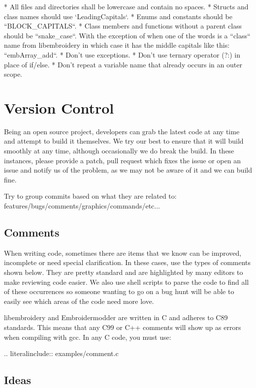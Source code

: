 \documentclass[a4paper]{report}
\begin{document}
* All files and directories shall be lowercase and contain no spaces.
* Structs and class names should use `LeadingCapitals`.
* Enums and constants should be ``BLOCK\_CAPITALS``.
* Class members and functions without a parent class should be ``snake\_case``.
  With the exception of when one of the words is a ``class`` name from
  libembroidery in which case it has the middle capitals like this:
  ``embArray\_add``.
* Don't use exceptions.
* Don't use ternary operator (?:) in place of if/else.
* Don't repeat a variable name that already occurs in an outer scope.

\section{Version Control}

Being an open source project, developers can grab the latest code at any
time and attempt to build it themselves. We try our best to ensure that
it will build smoothly at any time, although occasionally we do break
the build. In these instances, please provide a patch, pull request
which fixes the issue or open an issue and notify us of the problem, as
we may not be aware of it and we can build fine.

Try to group commits based on what they are related to:
features/bugs/comments/graphics/commands/etc...

\subsection{Comments}

When writing code, sometimes there are items that we know can be
improved, incomplete or need special clarification. In these cases, use
the types of comments shown below. They are pretty standard and are
highlighted by many editors to make reviewing code easier. We also use
shell scripts to parse the code to find all of these occurrences so
someone wanting to go on a bug hunt will be able to easily see which
areas of the code need more love.

libembroidery and Embroidermodder are written in C and adheres to C89 standards. This means
that any C99 or C++ comments will show up as errors when compiling with
gcc. In any C code, you must use:

.. literalinclude:: examples/comment.c

\subsection{Ideas}
\end{document}
